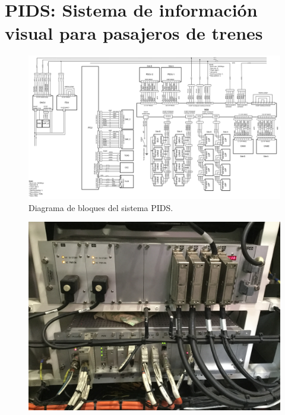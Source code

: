 \pagebreak
\section{PIDS: Sistema de información visual para pasajeros de trenes}

\begin{figure}[ht]
	\centering
	\includegraphics[width=1\textwidth]{./Figures/diagramaPIDS.png}
	\caption{Diagrama de bloques del sistema PIDS.}
	\label{fig:diagramaPIDS}
\end{figure}


\begin{figure}[ht]
	\centering
	\includegraphics[width=1\textwidth]{./Figures/rackPIDS1.JPG}
	\caption{}
	\label{fig:rackPIDS1}
\end{figure}


